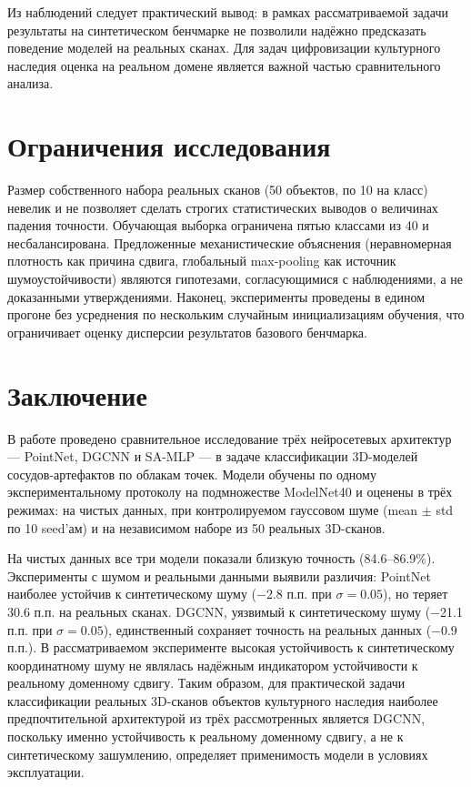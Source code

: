 \documentclass{misisarticle}
\begin{document}
Из наблюдений следует практический вывод: в рамках рассматриваемой задачи результаты на синтетическом бенчмарке не позволили надёжно предсказать поведение моделей на реальных сканах. Для задач цифровизации культурного наследия оценка на реальном домене является важной частью сравнительного анализа.

\section{Ограничения исследования}

Размер собственного набора реальных сканов (50 объектов, по 10 на класс) невелик и не позволяет сделать строгих статистических выводов о величинах падения точности. Обучающая выборка ограничена пятью классами из 40 и несбалансирована. Предложенные механистические объяснения (неравномерная плотность как причина сдвига, глобальный max-pooling как источник шумоустойчивости) являются гипотезами, согласующимися с наблюдениями, а не доказанными утверждениями. Наконец, эксперименты проведены в едином прогоне без усреднения по нескольким случайным инициализациям обучения, что ограничивает оценку дисперсии результатов базового бенчмарка.

\section{Заключение}

В работе проведено сравнительное исследование трёх нейросетевых архитектур — PointNet, DGCNN и SA-MLP — в задаче классификации 3D-моделей сосудов-артефактов по облакам точек. Модели обучены по одному экспериментальному протоколу на подмножестве ModelNet40 и оценены в трёх режимах: на чистых данных, при контролируемом гауссовом шуме (mean $\pm$ std по 10 seed'ам) и на независимом наборе из 50 реальных 3D-сканов.

На чистых данных все три модели показали близкую точность (84.6--86.9\%). Эксперименты с шумом и реальными данными выявили различия: PointNet наиболее устойчив к синтетическому шуму (−2.8 п.п. при $\sigma=0.05$), но теряет 30.6 п.п. на реальных сканах. DGCNN, уязвимый к синтетическому шуму (−21.1 п.п. при $\sigma=0.05$), единственный сохраняет точность на реальных данных (−0.9 п.п.). В рассматриваемом эксперименте высокая устойчивость к синтетическому координатному шуму не являлась надёжным индикатором устойчивости к реальному доменному сдвигу. Таким образом, для практической задачи классификации реальных 3D-сканов объектов культурного наследия наиболее предпочтительной архитектурой из трёх рассмотренных является DGCNN, поскольку именно устойчивость к реальному доменному сдвигу, а не к синтетическому зашумлению, определяет применимость модели в условиях эксплуатации.
\end{document}
